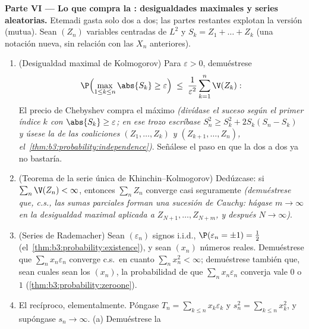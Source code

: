 \begin{problem}
\medskip
\noindent\textbf{Parte VI --- Lo que compra la
 :
desigualdades maximales y series aleatorias.} Etemadi gasta solo
 dos a dos; las
partes restantes explotan la versión  (mutua). Sean $(Z_n)$
variables 
centradas de $L^2$ y $S_k = Z_1 + \dots + Z_k$ (una notación nueva, sin
relación con las $X_n$ anteriores).
\begin{enumerate}[resume]
  \item (Desigualdad maximal de Kolmogorov) Para $\varepsilon
        > 0$, demuéstrese
        \[
        \P\Bigl(\max_{1\leq k\leq n}\abs{S_k} \geq
        \varepsilon\Bigr) \;\leq\;
        \frac1{\varepsilon^2}\sum_{k=1}^n\V(Z_k) :
        \]
        El precio de Chebyshev compra el máximo \emph{(divídase el
        suceso según el primer índice $k$ con
        $\abs{S_k} \geq \varepsilon$; en ese trozo escríbase
        $S_n^2 \geq S_k^2 + 2S_k(S_n - S_k)$ y úsese la
         de las
        coaliciones $(Z_1, \dots, Z_k)$ y $(Z_{k+1}, \dots, Z_n)$,
        el~\cref{thm:b3:probability:independence})}. Señálese el paso en
        que la 
        dos a dos ya no bastaría. \item (Teorema de la serie única de
        Khinchin--Kolmogorov) Dedúzcase: si $\sum_n\V(Z_n) < \infty$,
        entonces $\sum_nZ_n$ converge casi seguramente
        \emph{(demuéstrese que, c.s., las sumas parciales forman una
        sucesión de Cauchy: hágase $m \to
        \infty$ en la desigualdad maximal aplicada a
        $Z_{N+1}, \dots, Z_{N+m}$, y después $N \to
        \infty$)}. \item (Series de Rademacher) Sean $(\varepsilon_n)$
        signos i.i.d., $\P(\varepsilon_n = \pm1) =
        \frac12$ (el~\cref{thm:b3:probability:existence}), y sean
        $(x_n)$ números reales. Demuéstrese que $\sum_nx_n\varepsilon_n$
        converge c.s.\ en cuanto $\sum_nx_n^2 < \infty$; demuéstrese
        también que, sean cuales sean los $(x_n)$, la probabilidad de
        que $\sum_nx_n\varepsilon_n$ converja vale $0$ o $1$
        (\cref{thm:b3:probability:zeroone}).
  \item El recíproco, elementalmente. Póngase $T_n = \sum_{k\leq
        n}x_k\varepsilon_k$ y $s_n^2 = \sum_{k\leq
        n}x_k^2$, y supóngase $s_n \to \infty$. (a) Demuéstrese la

\end{enumerate}
\end{problem}
